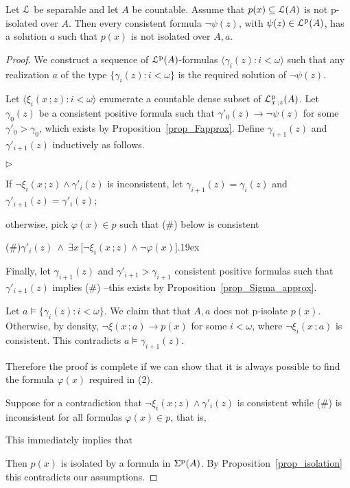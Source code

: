 \documentclass[10pt,oneside]{amsproc}
\newcommand{\mylabel}[1]{{#1}\hfill}
\renewenvironment{itemize}
  {\begin{list}{$\triangleright$}{%
  \setlength{\parskip}{0mm}
  \setlength{\topsep}{.4\baselineskip}
  \setlength{\rightmargin}{0mm}
  \setlength{\listparindent}{0mm}
  \setlength{\itemindent}{0mm}
  \setlength{\labelwidth}{3ex}
  \setlength{\itemsep}{.2\baselineskip}
  \setlength{\parsep}{.2\baselineskip}
  \setlength{\partopsep}{0mm}
  \setlength{\labelsep}{1ex}
  \setlength{\leftmargin}{\labelwidth+\labelsep}
  \let\makelabel\mylabel}}{%
\end{list}}
\begin{document}
\begin{lemma}\label{lem_kuratowskiUlam}
Let ${\EuScript L}$ be separable and let $A$ be countable.
Assume that $p(x)\subseteq{\EuScript L}(A)$ is not p-isolated over $A$.
Then every consistent formula $\neg\psi(z)$, with $\psi(z)\in{\EuScript L}^{\rm p}(A)$, has a solution $a$ such that $p(x)$ is not isolated over $A,a$.
\end{lemma}
\begin{proof}
We construct a sequence of ${\EuScript L}^{\rm p}(A)$-formulas $\langle\gamma_i(z):i<\omega\rangle$ such that any realization $a$ of the type $\big\{\gamma_i(z):i<\omega\big\}$ is the required solution of $\neg\psi(z)$.

Let $\langle\xi_i(x\,;z):i<\omega\rangle$ enumerate a countable dense subset of ${\EuScript L}^{\rm p}_{x\,;z}(A)$.
Let $\gamma_0(z)$ be a consistent positive formula such that $\gamma'_0(z)\rightarrow\neg\psi(z)$ for some $\gamma'_0>\gamma_0$, which exists by Proposition~\ref{prop_Fapprox}.
Define $\gamma_{i+1}(z)$ and  $\gamma'_{i+1}(z)$ inductively as follows.

\begin{itemize}
   \item[1.] If $\neg\xi_i(x\,;z)\wedge\gamma'_i(z)$ is inconsistent, let $\gamma_{i+1}(z)=\gamma_i(z)$ and  $\gamma'_{i+1}(z)=\gamma'_i(z)$;
   \item[2.] otherwise, pick $\varphi(x)\in p$ such that (\#) below is consistent
   
   (\#)\hfil$\gamma'_i(z)\ \wedge\ \exists x\,\big[\neg\xi_i(x\,;z)\wedge\neg\varphi(x)\big].$\kern19ex
   
   Finally, let $\gamma_{i+1}(z)$ and $\gamma'_{i+1}>\gamma_{i+1}$ consistent positive formulas such that $\gamma'_{i+1}(z)$ implies (\#) --this exists by Proposition~\ref{prop_Sigma_approx}.
\end{itemize}
Let $a\models\{\gamma_i(z):i<\omega\}$.
We claim that that $A,a$ does not p-isolate $p(x)$.
Otherwise, by density, $\neg\xi(x\,;a)\rightarrow p(x)$ for some $i<\omega$, where $\neg\xi_i(x\,;a)$ is consistent.
This contradicts $a\models\gamma_{i+1}(z)$.

Therefore the proof is complete if we can show that it is always possible to find the formula $\varphi(x)$ required in (2).

Suppose for a contradiction that $\neg\xi_i(x\,;z)\wedge\gamma'_i(z)$ is consistent while (\#) is inconsistent for all formulas $\varphi(x)\in p$, that is, 


This immediately implies that 


Then $p(x)$ is isolated by a formula in $\Sigma^{\rm p}(A)$.
By Proposition~\ref{prop_isolation} this contradicts our assumptions.
\end{proof}
\end{document}
